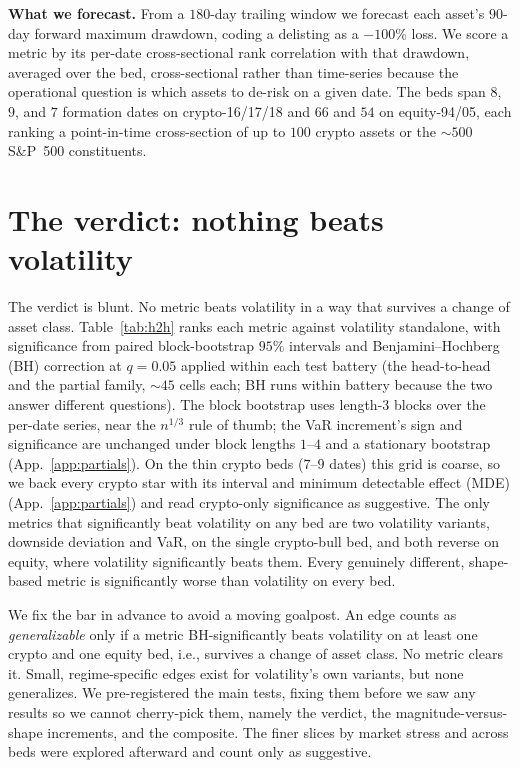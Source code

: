 \documentclass[sigconf,nonacm]{acmart}
\begin{document}
\textbf{What we forecast.} From a $180$-day trailing window we forecast each asset's
$90$-day forward maximum drawdown, coding a delisting as a $-100\%$ loss. We score a
metric by its per-date cross-sectional rank correlation with that drawdown, averaged
over the bed, cross-sectional rather than time-series because the operational
question is which assets to de-risk on a given date. The beds span $8$, $9$, and $7$
formation dates on crypto-16/17/18 and $66$ and $54$ on equity-94/05, each ranking a
point-in-time cross-section of up to $100$ crypto assets or the ${\sim}500$ S\&P~500
constituents.

\section{The verdict: nothing beats volatility}\label{sec:verdict}
The verdict is blunt. No metric beats volatility in a way that
survives a change of asset class. Table~\ref{tab:h2h} ranks each metric against
volatility standalone, with significance from paired block-bootstrap $95\%$ intervals
and Benjamini--Hochberg (BH) correction at $q=0.05$ applied within each test battery (the
head-to-head and the partial family, ${\sim}45$ cells each; BH runs within battery because
the two answer different questions). The block bootstrap uses length-$3$ blocks over the
per-date series, near the $n^{1/3}$ rule of thumb; the VaR increment's sign and
significance are unchanged under block lengths $1$--$4$ and a stationary bootstrap
(App.~\ref{app:partials}). On the thin crypto beds ($7$--$9$ dates) this grid is
coarse, so we back every crypto star with its interval and minimum detectable effect (MDE)
(App.~\ref{app:partials}) and read crypto-only significance as suggestive. The only
metrics that significantly beat volatility on
any bed are two volatility variants, downside deviation and VaR, on the single
crypto-bull bed, and both reverse on equity, where volatility significantly beats them.
Every genuinely different, shape-based metric is significantly worse than
volatility on every bed.

We fix the bar in advance to avoid a moving goalpost. An edge counts as
\emph{generalizable} only if a metric BH-significantly beats volatility on at least one
crypto and one equity bed, i.e., survives a change of asset class. No metric
clears it. Small, regime-specific edges exist for volatility's own variants, but none
generalizes. We pre-registered the main tests, fixing them before
we saw any results so we cannot cherry-pick them, namely the verdict, the
magnitude-versus-shape increments, and the composite. The finer slices by market stress
and across beds were explored afterward and count only as suggestive.
\end{document}
